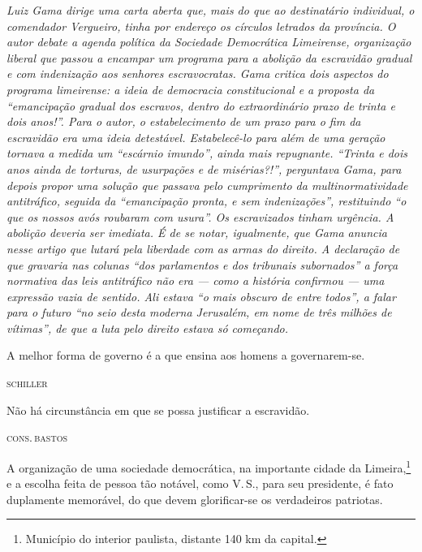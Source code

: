\begin{didascalia}\itshape
Luiz Gama dirige uma carta aberta que, mais do que ao destinatário
individual, o comendador Vergueiro, tinha por endereço os círculos
letrados da província. O autor debate a agenda política da Sociedade
Democrática Limeirense, organização liberal que passou a encampar um
programa para a abolição da escravidão gradual e com indenização aos
senhores escravocratas. Gama critica dois aspectos do programa
limeirense: a ideia de democracia constitucional e a proposta da
``emancipação gradual dos escravos, dentro do extraordinário prazo de
trinta e dois anos!''. Para o autor, o estabelecimento de um prazo para o
fim da escravidão era uma ideia detestável. Estabelecê-lo para além de
uma geração tornava a medida um ``escárnio imundo'', ainda mais
repugnante. ``Trinta e dois anos ainda de torturas, de usurpações e de
misérias?!'', perguntava Gama, para depois propor uma solução que passava
pelo cumprimento da multinormatividade antitráfico, seguida da
``emancipação pronta, e sem indenizações'', restituindo ``o que os nossos
avós roubaram com usura''. Os escravizados tinham urgência. A abolição
deveria ser imediata. É de se notar, igualmente, que Gama anuncia nesse
artigo que lutará pela liberdade com as armas do direito. A declaração
de que gravaria nas colunas ``dos parlamentos e dos tribunais subornados''
a força normativa das leis antitráfico não era --- como a história
confirmou --- uma expressão vazia de sentido. Ali estava ``o mais obscuro
de entre todos'', a falar para o futuro ``no seio desta moderna Jerusalém,
em nome de três milhões de vítimas'', de que a luta pelo direito estava
só começando.
\end{didascalia}

\pagebreak

\epigraph{A melhor forma de governo é a que ensina aos homens a governarem-se.}{\textsc{schiller}\footnotemark}

\epigraph{Não há circunstância em que se possa justificar a escravidão.}{\textsc{cons.\,bastos}\footnotemark}

A organização de uma sociedade democrática, na importante cidade da
Limeira,\footnote{Município do interior paulista, distante 140 km da
  capital.} e a escolha feita de pessoa tão notável, como V.\,S., para
seu presidente, é fato duplamente memorável, do que devem glorificar-se
os verdadeiros patriotas.

